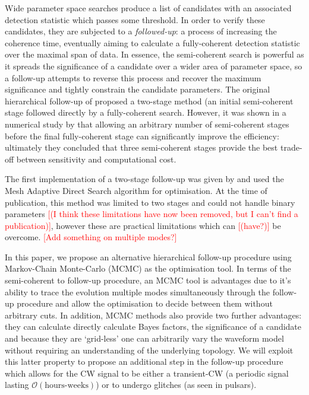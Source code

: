 \documentclass[aps, prd, twocolumn, superscriptaddress, floatfix, showpacs, nofootinbib, longbibliography]{revtex4-1}
\newcommand{\comment}[1]{\textcolor{red}{[#1]}}
\begin{document}
Wide parameter space searches produce a list of candidates with an associated
detection statistic which passes some threshold. In order to verify these
candidates, they are subjected to a \emph{followed-up}: a process of increasing
the coherence time, eventually aiming to calculate a fully-coherent detection
statistic over the maximal span of data. In essence, the semi-coherent search
is powerful as it spreads the significance of a candidate over a wider area of
parameter space, so a follow-up attempts to reverse this process and recover
the maximum significance and tightly constrain the candidate parameters. The
original hierarchical follow-up of \citet{brady2000} proposed a two-stage method
(an initial semi-coherent  stage followed directly by a fully-coherent search.
However, it was shown in a numerical study by \citet{cutler2005} that allowing
an arbitrary number of semi-coherent stages before the final fully-coherent
stage can significantly improve the efficiency: ultimately they concluded that
three semi-coherent stages provide the best trade-off between sensitivity and
computational cost.

The first implementation of a two-stage follow-up was given by
\citet{shaltev2013} and used the Mesh Adaptive Direct Search algorithm for
optimisation. At the time of publication, this method was limited to two stages
and could not handle binary parameters \comment{(I think these limitations have
now been removed, but I can't find a publication)}, however these are practical
limitations which can \comment{(have?)} be overcome.
\comment{Add something on multiple modes?}

In this paper, we propose an alternative hierarchical follow-up procedure using
Markov-Chain Monte-Carlo (MCMC) as the optimisation tool. In terms of the
semi-coherent to follow-up procedure, an MCMC tool is advantages due to it's
ability to trace the evolution multiple modes simultaneously through the
follow-up procedure and allow the optimisation to decide between them without
arbitrary cuts. In addition, MCMC methods also provide two further
advantages: they can calculate directly calculate Bayes factors, the significance
of a candidate and because they are `grid-less' one can arbitrarily vary the
waveform model without requiring an understanding of the underlying topology.
We will exploit this latter property to propose an additional step in the
follow-up procedure which allows for the CW signal to be either a transient-CW
(a periodic signal lasting $\mathcal{O}(\textrm{hours-weeks})$) or to undergo
glitches (as seen in pulsars).
\end{document}
